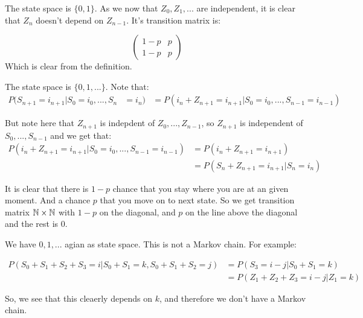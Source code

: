 
\beginproof
The state space is $\{0,1\}$. As we now that $Z_0,Z_1,...$ are independent, it is clear that $Z_n$ doesn't depend on $Z_{n-1}$. It's transition matrix is:

\[\begin{pmatrix}
1-p & p\\ 
1-p & p
\end{pmatrix}\]
Which is clear from the definition.\endproof


\beginproof
The state space is $\{0,1,...\}$.
Note that:
\begin{align*}
P(S_{n+1} = i_{n+1} | S_0 = i_0,...,S_{n} &=i_{n}) &= P(i_n+Z_{n+1}=i_{n+1} | S_0 = i_0,...,S_{n-1}=i_{n-1} )
\end{align*}

But note here that $Z_{n+1}$ is indepdent of $Z_0,...,Z_{n-1}$, so $Z_{n+1}$ is independent of $S_0,...,S_{n-1}$ and we get that:
\begin{align*}
P(i_n+Z_{n+1}=i_{n+1} | S_0 = i_0,...,S_{n-1}=i_{n-1} ) &= P(i_n+Z_{n+1}=i_{n+1})\\
&=  P(S_n+Z_{n+1}=i_{n+1} |S_n = i_n) 
\end{align*}

It is clear that there is $1-p$ chance that you stay where you are at an given moment. And a chance $p$ that you move on to next state. So we get transition matrix $\Bbb N \times \Bbb N$ with $1-p$ on the diagonal, and $p$ on the line above the diagonal and the rest is $0$.
\endproof


\beginproof
We have $0,1,...$ agian as state space. This is not a Markov chain. For example:

\begin{align*}
P(S_0 + S_1 + S_2 + S_3 = i  | S_0 + S_1 = k, S_0 + S_1 + S_2 = j) &= P(S_3  = i -j | S_0 + S_1 = k) \\
&= P(Z_1+Z_2+Z_3 = i-j | Z_1 = k)
\end{align*}

So, we see that this cleaerly depends on $k$, and therefore we don't have a Markov chain.
\endproof